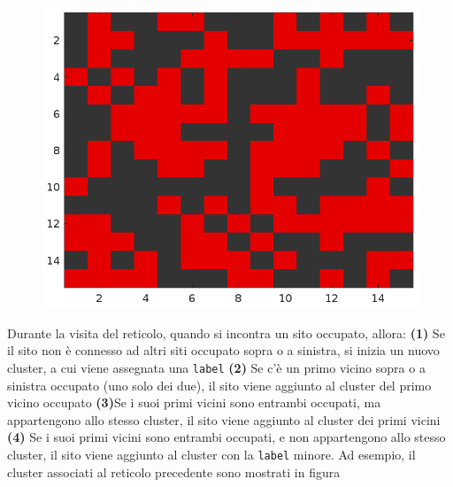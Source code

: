 \begin{figure}[H]
\begin{minipage}{0.45\textwidth}
\begin{tabular}{|*{15}{c|}}
		\end{tabular}
	\end{minipage}
	\hfill
	\begin{minipage}{0.45\textwidth}
		\centering
		\includegraphics[width=\linewidth]{images/basegrid}
		\label{fig:basegrid}
	\end{minipage}
\end{figure}
\noindent
Durante la visita del reticolo, quando si incontra un sito occupato, allora: \textbf{(1)} Se il sito non è connesso ad altri siti occupato sopra o a sinistra, si inizia un nuovo cluster, a cui viene assegnata una \texttt{label} \textbf{(2)} Se c’è un primo vicino sopra o a sinistra occupato (uno solo dei due), il sito viene aggiunto al cluster del primo vicino occupato \textbf{(3)}Se i suoi primi vicini sono entrambi occupati, ma appartengono allo stesso cluster, il sito viene aggiunto al cluster dei primi vicini \textbf{(4)} Se i suoi primi vicini sono entrambi occupati, e non appartengono allo stesso cluster, il sito viene aggiunto al cluster con la \texttt{label} minore. Ad esempio, il cluster associati al reticolo precedente sono
mostrati in figura
